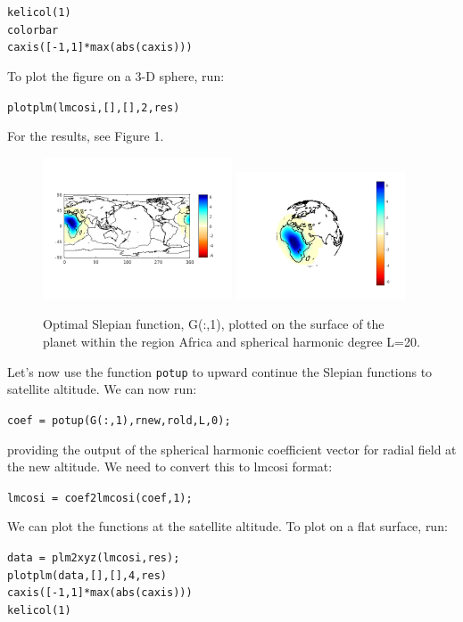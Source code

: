 \documentclass[11pt]{article}
\begin{document}
\verb+kelicol(1)+\\
\verb+colorbar+\\
\verb+caxis([-1,1]*max(abs(caxis)))+

To plot the figure on a 3-D sphere, run:

\verb+plotplm(lmcosi,[],[],2,res)+

For the results, see Figure 1.
\begin{figure}[H]
  \includegraphics[width=0.5\textwidth]{figures/G(:,1)flatml.png}
  \includegraphics[width=0.45\textwidth]{figures/G(:,1)ml.png}
  \caption{Optimal Slepian function, G(:,1), plotted on the surface of the planet within the region Africa and spherical harmonic degree L=20.}
\label{G(:,1)}
\end{figure}
Let's now use the function \verb+potup+ to upward continue the Slepian functions to satellite altitude.  We can now run:

\verb+coef = potup(G(:,1),rnew,rold,L,0);+

providing the output of the spherical harmonic coefficient vector for radial field at the new altitude.  We need to convert this to lmcosi format:

\verb+lmcosi = coef2lmcosi(coef,1);+

We can plot the functions at the satellite altitude.  To plot on a flat surface, run:

\verb+data = plm2xyz(lmcosi,res);+\\
\verb+plotplm(data,[],[],4,res)+\\
\verb+caxis([-1,1]*max(abs(caxis)))+\\
\verb+kelicol(1)+
\end{document}
